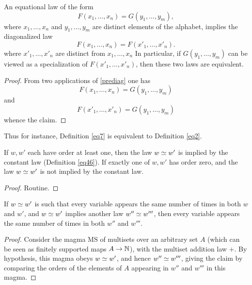 \begin{theorem}[Diagonalization]\label{diag}  An equational law of the form
  \begin{equation}\label{prediag} F(x_1,\dots,x_n) = G(y_1,\dots,y_m),
  \end{equation}
  where $x_1,\dots,x_n$ and $y_1,\dots,y_m$ are distinct elements of the alphabet, implies the diagonalized law
$$ F(x_1,\dots,x_n) = F(x'_1,\dots,x'_n).$$
where $x'_1,\dots,x'_n$ are distinct from $x_1,\dots,x_n$
In particular, if $G(y_1,\dots,y_m)$ can be viewed as a specialization of $F(x'_1,\dots,x'_n)$, then these two laws are equivalent.
\end{theorem}

\begin{proof}  From two applications of \eqref{prediag} one has
$$ F(x_1,\dots,x_n) = G(y_1,\dots,y_m)$$
and
$$ F(x'_1,\dots,x'_n) = G(y_1,\dots,y_m)$$
whence the claim.
\end{proof}

Thus for instance, Definition \ref{eq7} is equivalent to Definition \ref{eq2}.

\begin{theorem}\label{constant-impl}  If $w, w'$ each have order at least one, then the law $w \simeq w'$ is implied by the constant law (Definition \ref{eq46}).  If exactly one of $w, w'$ has order zero, and the law $w \simeq w'$ is not implied by the constant law.
\end{theorem}

\begin{proof} Routine.
\end{proof}

\begin{theorem}\label{variable-impl}\leanok  If $w \simeq w'$ is such that every variable appears the same number of times in both $w$ and $w'$, and $w \simeq w'$ implies another law $w'' \simeq w'''$, then every variable appears the same number of times in both $w''$ and $w'''$.
\end{theorem}

\begin{proof} Consider the magma $\mathrm{MS}$ of multisets over an arbitrary set $A$ (which can be seen as finitely supported maps $A\rightarrow \mathbb{N}$), with the multiset addition law $+$.  By hypothesis, this magma obeys $w \simeq w'$, and hence $w'' \simeq w'''$, giving the claim by comparing the orders of the elements of $A$ appearing in $w''$ and $w'''$ in this magma.
\end{proof}
